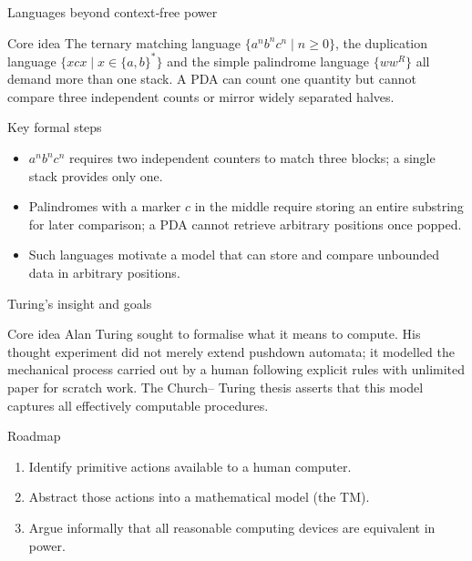 \begin{frame}[t]{Languages beyond context‑free power}
  \begin{tblock}{Core idea}
    The ternary matching language $\{a^n b^n c^n \mid n \ge 0\}$,
    the duplication language $\{ x c x \mid x \in \{a,b\}^*\}$ and
    the simple palindrome language $\{ w w^R \}$ all demand more than
    one stack.  A PDA can count one quantity but cannot compare three
    independent counts or mirror widely separated halves.
  \end{tblock}
  \begin{tblock}{Key formal steps}
    \begin{itemize}
      \item $a^n b^n c^n$ requires two independent counters to match three
        blocks; a single stack provides only one.
      \item Palindromes with a marker $c$ in the middle require storing an
        entire substring for later comparison; a PDA cannot retrieve
        arbitrary positions once popped.
      \item Such languages motivate a model that can store and compare
        unbounded data in arbitrary positions.
    \end{itemize}
  \end{tblock}
  \label{fr:7.1-02}
\end{frame}

\begin{frame}[t]{Turing’s insight and goals}
  \begin{tblock}{Core idea}
    Alan Turing sought to formalise what it means to compute.  His
    thought experiment did not merely extend pushdown automata; it
    modelled the mechanical process carried out by a human following
    explicit rules with unlimited paper for scratch work.  The Church–
    Turing thesis asserts that this model captures all effectively
    computable procedures.
  \end{tblock}
  \begin{tblock}{Roadmap}
    \begin{enumerate}
      \item Identify primitive actions available to a human computer.
      \item Abstract those actions into a mathematical model (the TM).
      \item Argue informally that all reasonable computing devices are
        equivalent in power.
    \end{enumerate}
  \end{tblock}
  \label{fr:7.1-03}
\end{frame}

